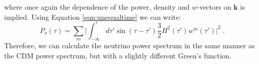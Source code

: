 \documentclass[twocolumn,superscriptaddress,prd]{revtex4}
\begin{document}
where once again the dependence of the power, density and
$w$-vectors on $\mathbf{k}$ is implied.
Using Equation \eqref{eqn:unequaltime} we can write:
\begin{equation}\label{eqn:densitypowernu2}
  P_\nu(\tau) = \sum_m \bigg | \int_{-\infty}^\tau d \tau' \sin
   (\tau
  - \tau') \frac{3}{2} H^2(\tau') w^m( \tau' ) \bigg |^2\;.
\end{equation}
Therefore, we can calculate the neutrino power spectrum in
the same manner as the CDM power spectrum, but with a slightly
different Green's function.


\end{document}

